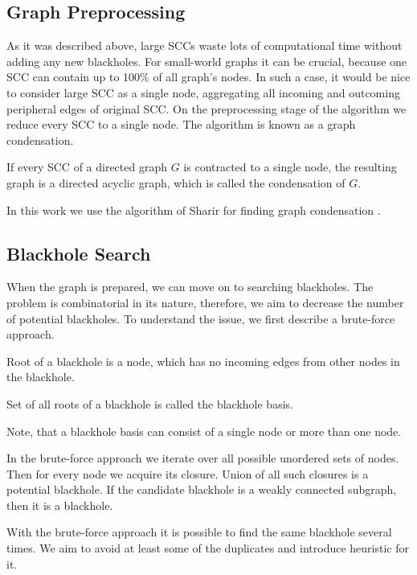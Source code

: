 \documentclass{svproc}
\begin{document}
%
\subsection{Graph Preprocessing}
As it was described above, large SCCs waste lots of computational time without adding any new blackholes. 
For small-world graphs it can be crucial, because one SCC can contain up to 100\% of all graph's nodes. 
In such a case, it would be nice to consider large SCC as a single node, aggregating all incoming and outcoming peripheral edges
of original SCC.
On the preprocessing stage of the algorithm we reduce every SCC to a single node. The algorithm is known as a graph condensation.

\begin{definition}
If every SCC of a directed graph $G$ is contracted to a single node, the resulting graph is a directed acyclic graph, which is called the condensation of $G$.
\end{definition}

In this work we use the algorithm of Sharir for finding graph condensation \cite{sharir1981strong}. 

\subsection{Blackhole Search}
When the graph is prepared, we can move on to searching blackholes. The problem is combinatorial in its nature, therefore, we aim to
decrease the number of potential blackholes.
To understand the issue, we first describe a brute-force approach. 

\begin{definition}
Root of a blackhole is a node, which has no incoming edges from other nodes in the blackhole.
\end{definition}

\begin{definition}
Set of all roots of a blackhole is called the blackhole basis.
\end{definition}

Note, that a blackhole basis can consist of a single node or more than one node. 

In the brute-force approach we iterate over all possible unordered sets of nodes. 
Then for every node we acquire its closure. Union of all such closures is a potential blackhole.
If the candidate blackhole is a weakly connected subgraph, then it is a blackhole.

With the brute-force approach it is possible to find the same blackhole several times.
We aim to avoid at least some of the duplicates and introduce heuristic for it.
\end{document}
